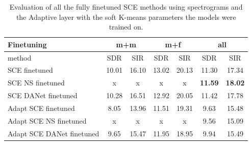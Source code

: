 \documentclass[master, tikz, final,11pt, dvipdfmx]{iscs-thesis}
\begin{document}
\begin{table}[h]
\begin{tabular}{l|c|c|c|c|c|c}
Finetuning & \multicolumn{2}{c|}{m+m} & \multicolumn{2}{c|}{m+f} & \multicolumn{2}{c}{all} \\ 
\hline 
method & SDR & SIR & SDR & SIR & SDR & SIR \\ 
\hline
SCE finetuned  & 10.01 & 16.10 & 13.02 & 20.13 & 11.30 & 17.34 \\ 
SCE NS finetuned & x & x & x & x & \textbf{11.59} & \textbf{18.02} \\ 
SCE DANet finetuned  & 10.28 & 16.51 & 12.92 & 20.05 & 11.42 & 17.78 \\ 
\hline 
\hline 
Adapt SCE finetuned  & 8.05 & 13.96 & 11.51 & 19.31 & 9.63 & 15.48 \\ 
Adapt SCE NS finetuned& x & x & x & x & 9.56 & 15.09 \\ 
Adapt SCE DANet finetuned & 9.65 & 15.47 & 11.95 & 18.95 & 9.94 & 15.49 \\ 

\end{tabular}
\caption[Evaluation of all the fully finetuned SCE improvement methods using spectrograms and the Adaptive layer]{Evaluation of all the fully finetuned SCE methods using spectrograms and the Adaptive layer with the soft K-means parameters the models were trained on.}
\label{table:finetune}
\end{table}
\end{document}
